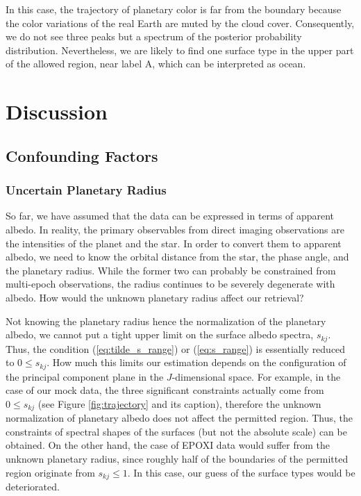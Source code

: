 \documentclass[iop,numberedappendix,apj]{emulateapj}
\begin{document}
In this case, the trajectory of planetary color is far from the boundary because the color variations of the real Earth are muted by the cloud cover. 
Consequently, we do not see three peaks but a spectrum of the posterior probability distribution. 
Nevertheless, we are likely to find one surface type in the upper part of the allowed region, near label A, which can be interpreted as ocean. 


\section{Discussion}
\label{s:discussion}

\subsection{Confounding Factors}
\label{ss:confonting_factors}


\subsubsection{Uncertain Planetary Radius}
\label{sss:uncertain_radius}

So far, we have assumed that the data can be expressed in terms of apparent albedo. 
In reality, the primary observables from direct imaging observations are the intensities of the planet and the star. 
In order to convert them to apparent albedo, we need to know the orbital distance from the star, the phase angle, and the planetary radius. 
While the former two can probably be constrained from multi-epoch observations, the radius continues to be severely degenerate with albedo. 
How would the unknown planetary radius affect our retrieval? 

Not knowing the planetary radius hence the normalization of the planetary albedo, we cannot put a tight upper limit on the surface albedo spectra, $s_{kj}$. 
Thus, the condition (\ref{eq:tilde_s_range}) or (\ref{eq:s_range}) is essentially  reduced to $0 \leq s_{kj}$. 
How much this limits our estimation depends on the configuration of the principal component plane in the $J$-dimensional space. 
For example, in the case of our mock data, the three significant constraints actually come from $0 \leq s_{kj}$ (see Figure \ref{fig:trajectory} and its caption), therefore the unknown normalization of planetary albedo does not affect the permitted region. 
Thus, the constraints of spectral shapes of the surfaces (but not the absolute scale) can be obtained. 
On the other hand, the case of EPOXI data would suffer from the unknown planetary radius, since roughly half of the boundaries of the permitted region originate from $ s_{kj} \leq 1$. 
In this case, our guess of the surface types would be deteriorated. 
\end{document}
